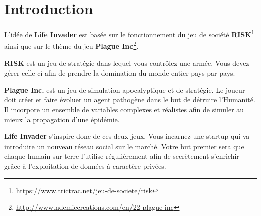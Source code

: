 \chapter*{Introduction}
\label{chap:introduction}

L'idée de \textbf{Life Invader} est basée sur le fonctionnement du jeu de société \textbf{RISK}\footnote{\url{https://www.trictrac.net/jeu-de-societe/risk}} ainsi que sur le thème du jeu \textbf{Plague Inc}\footnote{\url{http://www.ndemiccreations.com/en/22-plague-inc}}.

\textbf{RISK} est un jeu de stratégie dans lequel vous contrôlez une armée. Vous devez gérer celle-ci afin de prendre la domination du monde entier pays par pays.

\textbf{Plague Inc.} est un jeu de simulation apocalyptique et de stratégie. Le joueur doit créer et faire évoluer un agent pathogène dans le but de détruire l'Humanité. 
Il incorpore un ensemble de variables complexes et réalistes afin de simuler au mieux la propagation d'une épidémie.

\textbf{Life Invader} s'inspire donc de ces deux jeux. Vous incarnez une startup qui va introduire un nouveau réseau social sur le marché. Votre but premier sera que chaque humain sur terre l'utilise régulièrement afin de secrètement s'enrichir grâce à l'exploitation de données à caractère privées.

